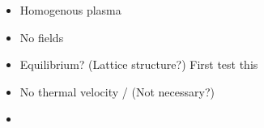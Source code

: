 	\begin{itemize}
		\item Homogenous plasma
		\item No fields
		\item Equilibrium? (Lattice structure?) First test this
		\item No thermal velocity / (Not necessary?)
		\item
	\end{itemize}


%
%
%
